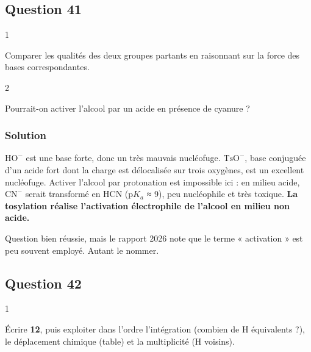 \documentclass[11pt,a4paper]{article}
\begin{document}
\hypertarget{question-41}{%
\subsection{Question 41}\label{question-41}}

\begin{indication}{1}

Comparer les qualités des deux groupes partants en raisonnant sur la force des bases correspondantes.

\end{indication}

\begin{indication}{2}

Pourrait-on activer l'alcool par un acide en présence de cyanure ?

\end{indication}

\hypertarget{solution-40}{%
\subsubsection{Solution}\label{solution-40}}

\(\mathrm{HO^-}\) est une base forte, donc un très mauvais nucléofuge. \(\mathrm{TsO^-}\), base conjuguée d'un acide fort dont la charge est délocalisée sur trois oxygènes, est un excellent nucléofuge. Activer l'alcool par protonation est impossible ici : en milieu acide, \(\mathrm{CN^-}\) serait transformé en HCN (p\(K_a\) ≈ 9), peu nucléophile et très toxique. \textbf{La tosylation réalise l'activation électrophile de l'alcool en milieu non acide.}

\begin{jury}

Question bien réussie, mais le rapport 2026 note que le terme « activation » est peu souvent employé. Autant le nommer.

\end{jury}

\hypertarget{question-42}{%
\subsection{Question 42}\label{question-42}}

\begin{indication}{1}

Écrire \textbf{12}, puis exploiter dans l'ordre l'intégration (combien de H équivalents ?), le déplacement chimique (table) et la multiplicité (H voisins).

\end{indication}
\end{document}
